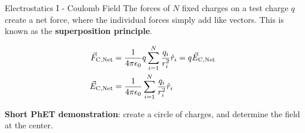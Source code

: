 \documentclass{beamer}
\begin{document}
\begin{frame}{Electrostatics I - Coulomb Field}
The forces of $N$ fixed charges on a test charge $q$ create a net force, where the individual forces simply add like vectors.  This is known as the \textbf{superposition principle}.
\begin{tcolorbox}[colback=white,colframe=gray,title=Superposition Principle]
\begin{align}
\vec{F}_{\rm C,Net} &= \frac{1}{4\pi\epsilon_{\rm 0}} q \sum_{i = 1}^N \frac{q_i}{r_i^2}\hat{r}_i = q \vec{E}_{\rm C,Net} \\
\vec{E}_{\rm C,Net} &= \frac{1}{4\pi\epsilon_{\rm 0}} \sum_{i = 1}^N \frac{q_i}{r_i^2}\hat{r}_i
\end{align}
\end{tcolorbox}
\textbf{Short PhET demonstration}: create a circle of charges, and determine the field at the center.
\end{frame}
\end{document}
